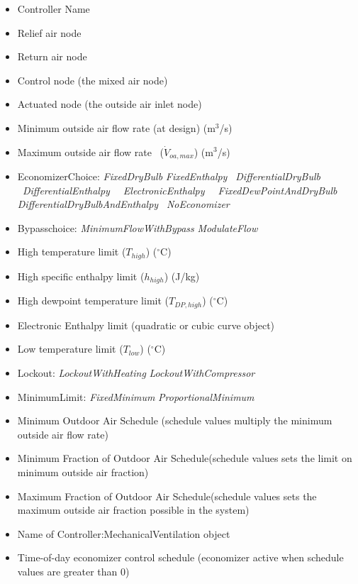 \begin{itemize}
\item
  Controller Name
\item
  Relief air node
\item
  Return air node
\item
  Control node (the mixed air node)
\item
  Actuated node (the outside air inlet node)
\item
  Minimum outside air flow rate (at design) (m\(^{3}\)/s)
\item
  Maximum outside air flow rate~ (\({\dot V_{oa,max }}\)) (m\(^{3}\)/s)
\item
  EconomizerChoice: \emph{FixedDryBulb} \textbar{} \emph{FixedEnthalpy} \textbar{} \emph{~DifferentialDryBulb~} \textbar{} \emph{~DifferentialEnthalpy} \textbar{} \emph{~~ElectronicEnthalpy} \textbar{} \emph{~~FixedDewPointAndDryBulb~~~} \textbar{} \emph{DifferentialDryBulbAndEnthalpy~} \textbar{} \emph{NoEconomizer}
\item
  Bypasschoice: \emph{MinimumFlowWithBypass} \textbar{} \emph{ModulateFlow}
\item
  High temperature limit (\({T_{high}}\)) (\(^{\circ}\)C)
\item
  High specific enthalpy limit (\({h_{high}}\)) (J/kg)
\item
  High dewpoint temperature limit (\({T_{DP,high}}\)) (\(^{\circ}\)C)
\item
  Electronic Enthalpy limit (quadratic or cubic curve object)
\item
  Low temperature limit (\({T_{low}}\)) (\(^{\circ}\)C)
\item
  Lockout: \emph{LockoutWithHeating} \textbar{} \emph{LockoutWithCompressor}
\item
  MinimumLimit: \emph{FixedMinimum} \textbar{} \emph{ProportionalMinimum}
\item
  Minimum Outdoor Air Schedule (schedule values multiply the minimum outside air flow rate)
\item
  Minimum Fraction of Outdoor Air Schedule(schedule values sets the limit on minimum outside air fraction)
\item
  Maximum Fraction of Outdoor Air Schedule(schedule values sets the maximum outside air fraction possible in the system)
\item
  Name of Controller:MechanicalVentilation object
\item
  Time-of-day economizer control schedule (economizer active when schedule values are greater than 0)

\end{itemize}
